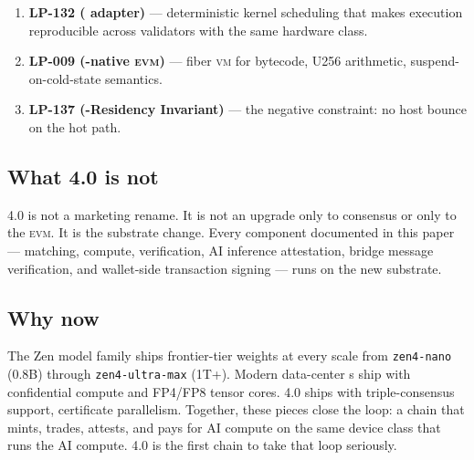 \begin{enumerate}[leftmargin=1.4em]
  \item \textbf{LP-132 (\QuasarGPU{} adapter)} --- deterministic kernel
        scheduling that makes \GPU{} execution reproducible across
        validators with the same hardware class.
  \item \textbf{LP-009 (\GPU{}-native \textsc{evm})} --- fiber \textsc{vm}
        for bytecode, U256 arithmetic, suspend-on-cold-state semantics.
  \item \textbf{LP-137 (\GPU{}-Residency Invariant)} --- the negative
        constraint: no host bounce on the hot path.
\end{enumerate}

\subsection{What \Zoo{} 4.0 is not}

\Zoo{} 4.0 is not a marketing rename. It is not an upgrade only to consensus
or only to the \textsc{evm}. It is the substrate change. Every component
documented in this paper --- \DEX{} matching, \FHE{} compute, \ZKP{}
verification, AI inference attestation, bridge message verification, and
wallet-side transaction signing --- runs on the new substrate.

\subsection{Why now}

The Zen model family ships frontier-tier weights at every scale from
\texttt{zen4-nano} (0.8B) through \texttt{zen4-ultra-max} (1T+). Modern
data-center \GPU{}s ship with confidential compute and FP4/FP8 tensor
cores. \Quasar{} 4.0 ships with triple-consensus support, certificate
parallelism. Together, these pieces close the loop: a chain that mints,
trades, attests, and pays for AI compute on the same device class that
runs the AI compute. \Zoo{} 4.0 is the first chain to take that loop
seriously.
